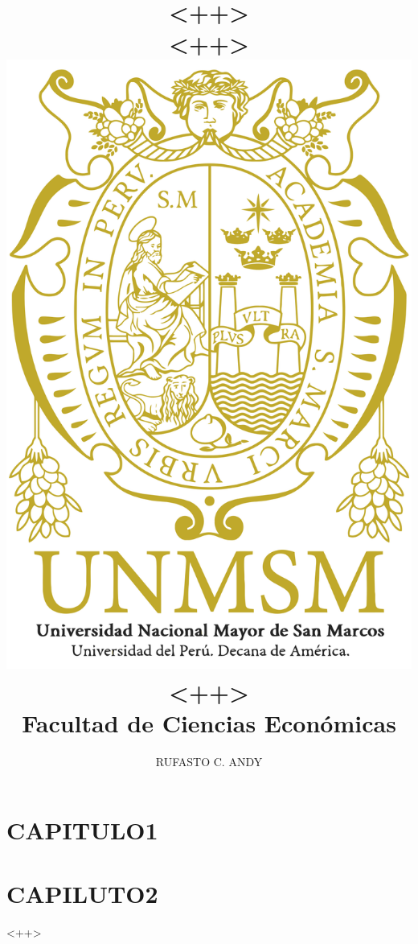 \documentclass[15pt]{report}
\title{
        {\sc \bf \color{usm} \huge{<++>}\\ \LARGE{<++>}}
        \\
      {\includegraphics[scale=0.17]{unmsm.png}}
       \\
        {<++>}
       \\
        {Facultad de Ciencias Económicas}
       }
\author{RUFASTO C. ANDY}
\date{}
\begin{document}
	\maketitle
	\begingroup
	\Large
	\tableofcontents

	\chapter{\color{usm}CAPITULO1}
	\chapter{\color{usm}CAPILUTO2}
		<++>
	\endgroup
\end{document}
